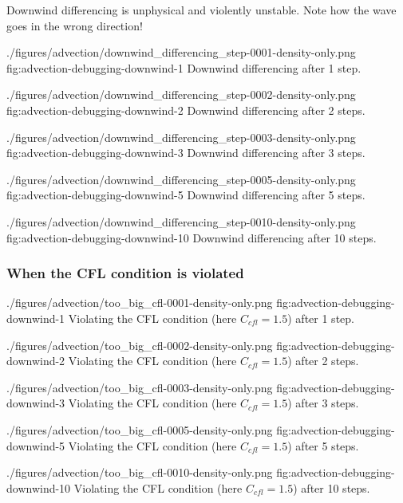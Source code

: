 Downwind differencing is unphysical and violently unstable.
Note how the wave goes in the wrong direction!


\quickfigcap
	{./figures/advection/downwind_differencing_step-0001-density-only.png}
	{fig:advection-debugging-downwind-1}
	{Downwind differencing after 1 step.}

\quickfigcap
	{./figures/advection/downwind_differencing_step-0002-density-only.png}
	{fig:advection-debugging-downwind-2}
	{Downwind differencing after 2 steps.}

\quickfigcap
	{./figures/advection/downwind_differencing_step-0003-density-only.png}
	{fig:advection-debugging-downwind-3}
	{Downwind differencing after 3 steps.}

\quickfigcap
	{./figures/advection/downwind_differencing_step-0005-density-only.png}
	{fig:advection-debugging-downwind-5}
	{Downwind differencing after 5 steps.}

\quickfigcap
	{./figures/advection/downwind_differencing_step-0010-density-only.png}
	{fig:advection-debugging-downwind-10}
	{Downwind differencing after 10 steps.}








\subsubsection{When the CFL condition is violated}


\quickfigcap
	{./figures/advection/too_big_cfl-0001-density-only.png}
	{fig:advection-debugging-downwind-1}
	{Violating the CFL condition (here $C_{cfl} = 1.5$) after 1 step.}

\quickfigcap
	{./figures/advection/too_big_cfl-0002-density-only.png}
	{fig:advection-debugging-downwind-2}
	{Violating the CFL condition (here $C_{cfl} = 1.5$) after 2 steps.}

\quickfigcap
	{./figures/advection/too_big_cfl-0003-density-only.png}
	{fig:advection-debugging-downwind-3}
	{Violating the CFL condition (here $C_{cfl} = 1.5$) after 3 steps.}

\quickfigcap
	{./figures/advection/too_big_cfl-0005-density-only.png}
	{fig:advection-debugging-downwind-5}
	{Violating the CFL condition (here $C_{cfl} = 1.5$) after 5 steps.}

\quickfigcap
	{./figures/advection/too_big_cfl-0010-density-only.png}
	{fig:advection-debugging-downwind-10}
	{Violating the CFL condition (here $C_{cfl} = 1.5$) after 10 steps.}

